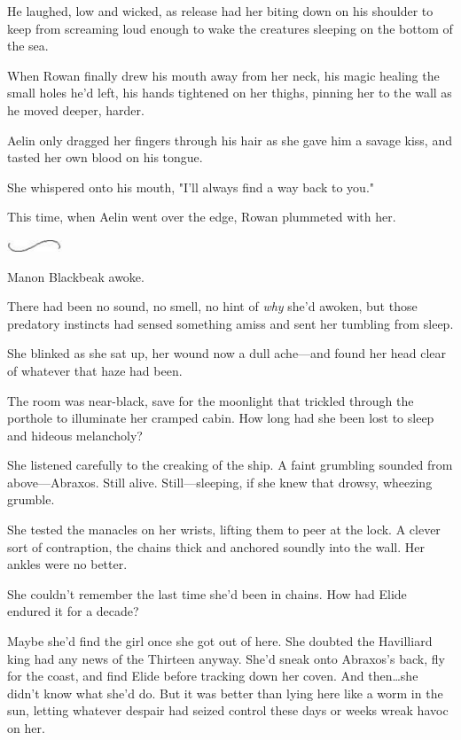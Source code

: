 He laughed, low and wicked, as release had her biting down on his shoulder to keep from screaming loud enough to wake the creatures sleeping on the bottom of the sea.

When Rowan finally drew his mouth away from her neck, his magic healing the small holes he'd left, his hands tightened on her thighs, pinning her to the wall as he moved deeper, harder.

Aelin only dragged her fingers through his hair as she gave him a savage kiss, and tasted her own blood on his tongue.

She whispered onto his mouth, "I'll always find a way back to you."

This time, when Aelin went over the edge, Rowan plummeted with her.

\begin{center}
	\includegraphics[width=0.65in,height=0.13in]{images/seperator}
\end{center}

Manon Blackbeak awoke.

There had been no sound, no smell, no hint of \emph{why} she'd awoken, but those predatory instincts had sensed something amiss and sent her tumbling from sleep.

She blinked as she sat up, her wound now a dull ache---and found her head clear of whatever that haze had been.

The room was near-black, save for the moonlight that trickled through the porthole to illuminate her cramped cabin.
How long had she been lost to sleep and hideous melancholy?

She listened carefully to the creaking of the ship.
A faint grumbling sounded from above---Abraxos.
Still alive.
Still---sleeping, if she knew that drowsy, wheezing grumble.

She tested the manacles on her wrists, lifting them to peer at the lock.
A clever sort of contraption, the chains thick and anchored soundly into the wall.
Her ankles were no better.

She couldn't remember the last time she'd been in chains.
How had Elide endured it for a decade?

Maybe she'd find the girl once she got out of here.
She doubted the Havilliard king had any news of the Thirteen anyway.
She'd sneak onto Abraxos's back, fly for the coast, and find Elide before tracking down her coven.
And then\ldots she didn't know what she'd do.
But it was better than lying here like a worm in the sun, letting whatever despair had seized control these days or weeks wreak havoc on her.

